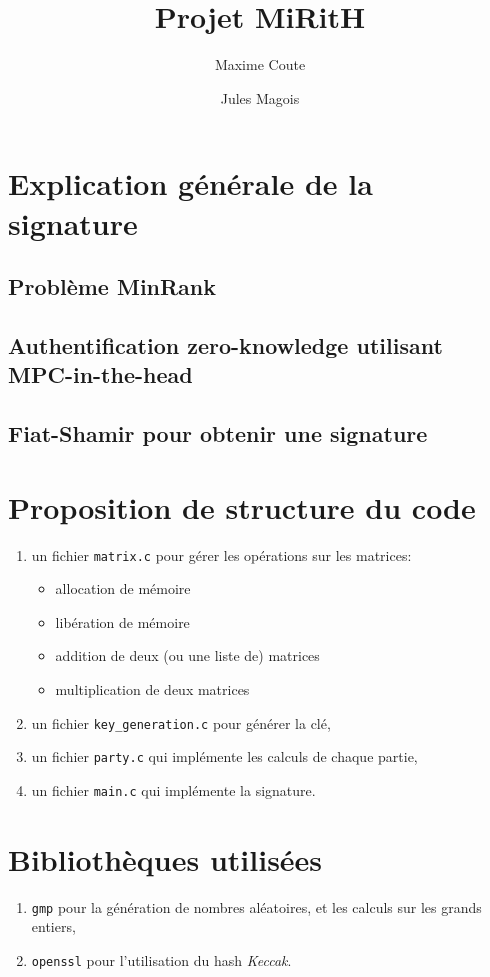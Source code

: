 \documentclass{article}
\title{Projet MiRitH}
\author{Maxime Coute \and Jules Magois}
\begin{document}
\maketitle

\section{Explication générale de la signature}
\subsection{Problème MinRank}
\subsection{Authentification zero-knowledge utilisant MPC-in-the-head}
\subsection{Fiat-Shamir pour obtenir une signature}

\section{Proposition de structure du code}

\begin{enumerate}
  \item un fichier \verb!matrix.c! pour gérer les opérations sur les matrices:
        \begin{itemize}
          \item allocation de mémoire
          \item libération de mémoire
          \item addition de deux (ou une liste de) matrices
          \item multiplication de deux matrices
        \end{itemize}
  \item un fichier \verb!key_generation.c! pour générer la clé,
  \item un fichier \verb!party.c! qui implémente les calculs de chaque partie,
  \item un fichier \verb!main.c! qui implémente la signature.
\end{enumerate}

\section{Bibliothèques utilisées}
\begin{enumerate}
  \item \verb!gmp! pour la génération de nombres aléatoires, et les calculs sur les grands entiers,
    \item \verb!openssl! pour l'utilisation du hash \emph{Keccak}.
\end{enumerate}
\end{document}

